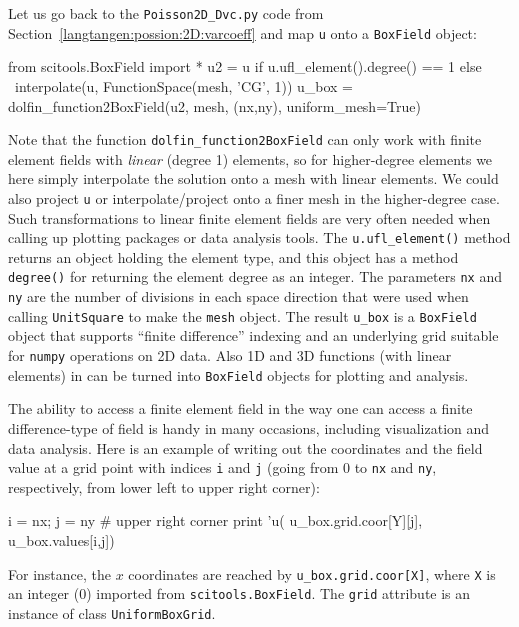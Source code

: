Let us go back to the {\fontsize{10pt}{10pt}\verb!Poisson2D_Dvc.py!} code from
Section~\ref{langtangen:possion:2D:varcoeff} and map {\fontsize{10pt}{10pt}\texttt{u}} onto a
{\fontsize{10pt}{10pt}\texttt{BoxField}} object:
\begin{python}
from scitools.BoxField import *
u2 = u if u.ufl_element().degree() == 1 else \
     interpolate(u, FunctionSpace(mesh, 'CG', 1))
u_box = dolfin_function2BoxField(u2, mesh, (nx,ny), uniform_mesh=True)
\end{python}
Note that the function {\fontsize{10pt}{10pt}\verb!dolfin_function2BoxField!} can only work with
finite element fields with \emph{linear} (degree 1) elements, so for
higher-degree elements we here simply interpolate the solution onto
a mesh with linear elements. We could also project {\fontsize{10pt}{10pt}\verb!u!} or 
interpolate/project onto a finer mesh in the higher-degree case.
Such transformations to linear finite element fields
are very often needed when calling up plotting packages or data analysis tools.
The {\fontsize{10pt}{10pt}\verb!u.ufl_element()!} method returns an object holding the element
type, and this object has a method {\fontsize{10pt}{10pt}\texttt{degree()}} for returning the
element degree as an integer.
The parameters {\fontsize{10pt}{10pt}\texttt{nx}} and {\fontsize{10pt}{10pt}\texttt{ny}} are the number of divisions in each space
direction that were used when calling {\fontsize{10pt}{10pt}\texttt{UnitSquare}} to make the
{\fontsize{10pt}{10pt}\texttt{mesh}} object. 
The result {\fontsize{10pt}{10pt}\verb!u_box!} is a {\fontsize{10pt}{10pt}\texttt{BoxField}}
object that supports ``finite difference'' indexing and an underlying
grid suitable for {\fontsize{10pt}{10pt}\texttt{numpy}} operations on 2D data.
Also 1D and 3D functions (with linear elements) in \dolfin{} can be turned
into {\fontsize{10pt}{10pt}\texttt{BoxField}} objects for plotting and analysis.

The ability to access a finite element field in the way one can access
a finite difference-type of field is handy in many occasions, including
visualization and data analysis.
Here is an example of writing out the coordinates and the field value
at a grid point with indices {\fontsize{10pt}{10pt}\texttt{i}} and {\fontsize{10pt}{10pt}\texttt{j}} (going from 0 to
{\fontsize{10pt}{10pt}\texttt{nx}} and {\fontsize{10pt}{10pt}\texttt{ny}}, respectively, from lower left to upper right corner):
\begin{python}
i = nx; j = ny   # upper right corner
print 'u(%
                       u_box.grid.coor[Y][j],
                       u_box.values[i,j])
\end{python}
For instance,
the $x$ coordinates are reached by {\fontsize{10pt}{10pt}\verb!u_box.grid.coor[X]!}, where
{\fontsize{10pt}{10pt}\texttt{X}} is an integer (0) imported from {\fontsize{10pt}{10pt}\texttt{scitools.BoxField}}.
The {\fontsize{10pt}{10pt}\texttt{grid}} attribute is an instance of class {\fontsize{10pt}{10pt}\texttt{UniformBoxGrid}}.

